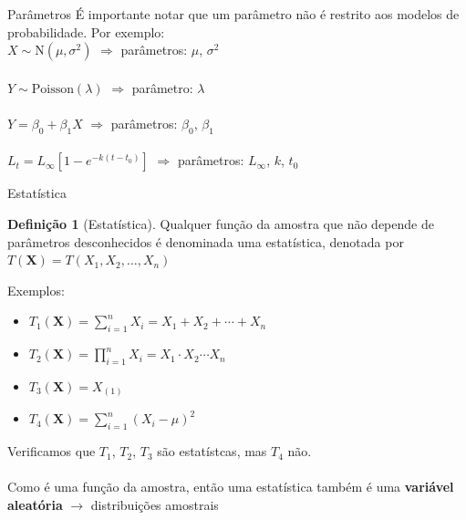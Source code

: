 \documentclass[10pt]{beamer}\usepackage[]{graphicx}\usepackage[]{color}
\newcommand{\mb}[1]{\mathbf{#1}}
\providecommand{\N}{\text{N}}
\theoremstyle{definition}
\newtheorem*{mydef}{Definição}
\begin{document}
\begin{frame}{Parâmetros}
  É importante notar que um parâmetro não é restrito aos modelos de
  probabilidade. Por exemplo: \\
  \vspace{1em}
  $X \sim \N(\mu, \sigma^2)$ $\Rightarrow$ parâmetros: $\mu$,
    $\sigma^2$ \\~\\
    $Y \sim \text{Poisson}(\lambda)$ $\Rightarrow$ parâmetro: $\lambda$ \\~\\
    $Y = \beta_0 + \beta_1 X$ $\Rightarrow$ parâmetros: $\beta_0$,
    $\beta_1$ \\~\\
    $L_t = L_{\infty}[1 - e^{-k(t - t_0)}]$ $\Rightarrow$ parâmetros:
    $L_{\infty}$, $k$, $t_0$
\end{frame}

\begin{frame}{Estatística}
  \begin{mydef}[Estatística]
    Qualquer função da amostra que não depende de parâmetros
    desconhecidos é denominada uma estatística, denotada por $T(\mb{X}) =
    T(X_1, X_2, \ldots, X_n)$
  \end{mydef}
  Exemplos:
  \begin{itemize}
  \item $T_1(\mb{X}) = \sum_{i=1}^{n} X_i = X_1 + X_2 + \cdots + X_n$
  \item $T_2(\mb{X}) = \prod_{i=1}^{n} X_i = X_1 \cdot X_2 \cdots X_n$
  \item $T_3(\mb{X}) = X_{(1)}$
  \item $T_4(\mb{X}) = \sum_{i=1}^{n} (X_i - \mu)^2$
  \end{itemize}
  \vspace{1em}
  Verificamos que $T_1$, $T_2$, $T_3$ são estatístcas, mas $T_4$
  não. \\~\\
  Como é uma função da amostra, então uma estatística também é uma
  \textbf{variável aleatória} $\rightarrow$ distribuições amostrais
\end{frame}
\end{document}

